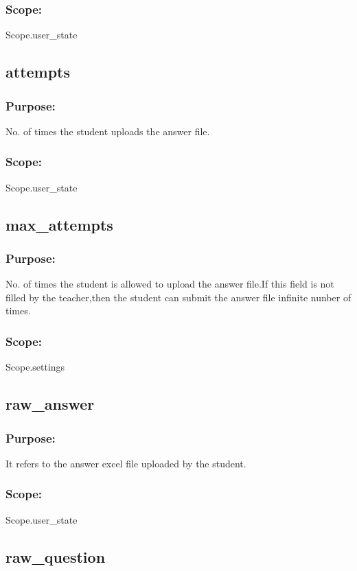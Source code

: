 \documentclass{scrreprt}
\begin{document}
\subsubsection{Scope:}
Scope.user_state

\subsection{attempts}
\subsubsection{Purpose:}
No. of times the student uploads the answer file.
\subsubsection{Scope:}
Scope.user_state

\subsection{max_attempts}

\subsubsection{Purpose:}
No. of times the student is allowed to upload the answer file.If this field is not filled by the teacher,then the 
student can submit the answer file infinite nunber of times. 
\subsubsection{Scope:}
Scope.settings


\subsection{raw_answer}

\subsubsection{Purpose:}
It refers to the answer excel file uploaded by the student.
\subsubsection{Scope:}
Scope.user_state

\subsection{raw_question}
\end{document}
